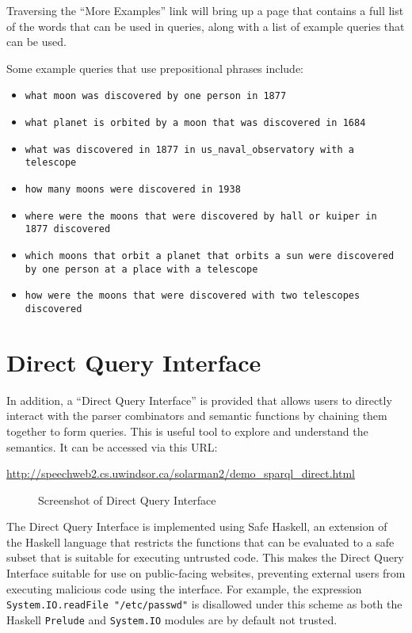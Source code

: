 \documentclass[../main.tex]{subfiles}
\begin{document}
Traversing the ``More Examples'' link will bring up a page that contains a full list of the words that can be used in queries, along with a list of example queries that can be used.

Some example queries that use prepositional phrases include:

\begin{itemize}
	\item \texttt{what moon was discovered by one person in 1877}
	\item \texttt{what planet is orbited by a moon that was discovered in 1684}
	\item \texttt{what was discovered in 1877 in us\_naval\_observatory with a \\ telescope}
	\item \texttt{how many moons were discovered in 1938}
	\item \texttt{where were the moons that were discovered by hall or kuiper in \\ 1877 discovered}
	\item \texttt{which moons that orbit a planet that orbits a sun were discovered \\ by one person at a place with a telescope}
	\item \texttt{how were the moons that were discovered with two telescopes\\ discovered}
\end{itemize}


\section{Direct Query Interface}

In addition, a ``Direct Query Interface'' is provided that allows users to directly interact with the parser combinators and semantic functions by chaining them together to form queries.  This is useful tool to explore and understand the semantics.  It can be accessed via this URL:

\url{http://speechweb2.cs.uwindsor.ca/solarman2/demo_sparql_direct.html}

\begin{figure}[h]
	\centering
	\caption{Screenshot of Direct Query Interface}
\end{figure}

The Direct Query Interface is implemented using Safe Haskell\cite{safehaskell}, an extension of the Haskell language that restricts the functions that can be evaluated
to a safe subset that is suitable for executing untrusted code.  This makes the Direct Query Interface suitable for use on public-facing websites, preventing external users from executing malicious code using the interface.  For example, the expression \texttt{System.IO.readFile "/etc/passwd"} is disallowed under this scheme as both the Haskell \texttt{Prelude} and \texttt{System.IO} modules are by default not trusted.
\end{document}
